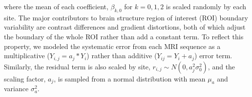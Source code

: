 where the mean of each coefficient,
$\beta_{k,0}$ for  $k=0,1,2$ is scaled randomly by each site. The major contributors to brain structure region of interest (ROI) boundary variability are contrast differences and gradient distortions, both of which adjust the boundary of the whole ROI rather than add a constant term. To reflect this property, we modeled the systematic error from each MRI sequence as a multiplicative ($Y_{i,j} = a_j*Y_i$) rather than additive ($Y_{ij} = Y_i + a_j$) error term. Similarly, the residual term is also scaled by site, $r_{i,j} \sim N(0,a_j^2\sigma_0^2)$, and the scaling factor, $a_j$, is sampled from a normal distribution with mean $\mu_a$ and variance $\sigma_{a}^2$.